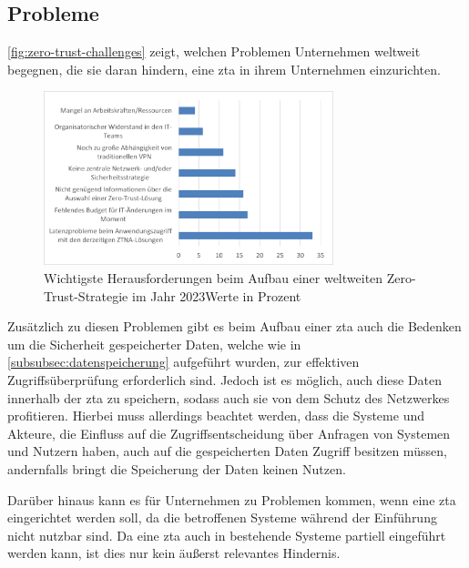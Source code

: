\subsection{Probleme}\label{subsec:probleme}
\autoref{fig:zero-trust-challenges} zeigt, welchen Problemen Unternehmen weltweit begegnen, die sie daran hindern, eine \ac{zta} in ihrem Unternehmen einzurichten.\autocite[\vglf][]{fortinet-2023}
\begin{figure}[htbp]
    \centering
    \includegraphics[width=0.75\textwidth, trim = {0.2cm 0.3cm 0.4cm 0.25cm}, clip]{src/abbildungen/Herausforderungen_ZeroTrust}
    \captionsetup{width=\linewidth, format=hang}
    \caption[Wichtigste Herausforderungen beim Aufbau einer weltweiten Zero-Trust-Strategie im Jahr 2023]{Wichtigste Herausforderungen beim Aufbau einer weltweiten Zero-Trust-Strategie im Jahr 2023\newline Werte in Prozent}
    \label{fig:zero-trust-challenges}
\end{figure}

Zusätzlich zu diesen Problemen gibt es beim Aufbau einer \ac{zta} auch die Bedenken um die Sicherheit gespeicherter Daten, welche wie in \autoref{subsubsec:datenspeicherung} aufgeführt wurden, zur effektiven Zugriffsüberprüfung erforderlich sind.
Jedoch ist es möglich, auch diese Daten innerhalb der \ac{zta} zu speichern, sodass auch sie von dem Schutz des Netzwerkes profitieren.
Hierbei muss allerdings beachtet werden, dass die Systeme und Akteure, die Einfluss auf die Zugriffsentscheidung über Anfragen von Systemen und Nutzern haben, auch auf die gespeicherten Daten Zugriff besitzen müssen, andernfalls bringt die Speicherung der Daten keinen Nutzen.

Darüber hinaus kann es für Unternehmen zu Problemen kommen, wenn eine \ac{zta} eingerichtet werden soll, da die betroffenen Systeme während der Einführung nicht nutzbar sind.
Da eine \ac{zta} auch in bestehende Systeme partiell eingeführt werden kann, ist dies nur kein äußerst relevantes Hindernis.
\clearpage
